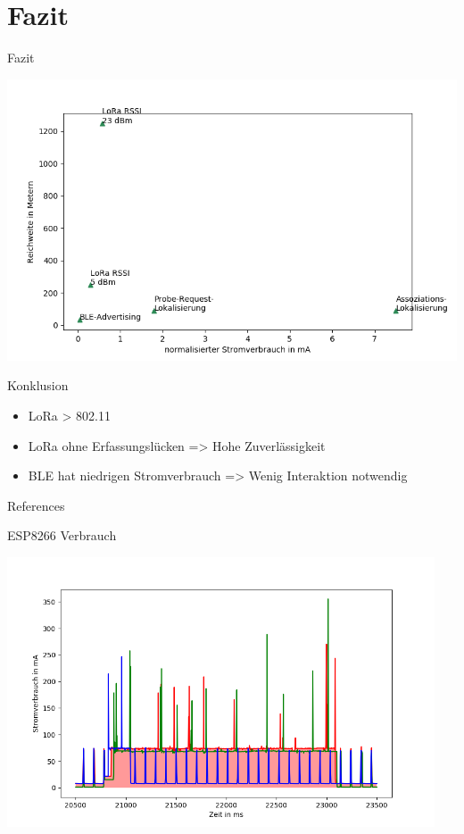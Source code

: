 \documentclass[18pt]{beamer}
\begin{document}
\section{Fazit}
\begin{frame}{Fazit}
	\begin{minipage}[t][0.5\textheight][t]{\textwidth}
		\centering
		\includegraphics[width=0.9\textheight]{plots/scatterplot.png}
	\end{minipage}


	\begin{block}{Konklusion}
			\begin{itemize}
				\item LoRa > 802.11
				\item LoRa ohne Erfassungslücken => Hohe Zuverlässigkeit
				\item BLE hat niedrigen Stromverbrauch => Wenig Interaktion notwendig
			\end{itemize}
	\end{block}

\end{frame}


\appendix
\beginbackup

\begin{frame}[allowframebreaks]{References}
\printbibliography
\end{frame}

\begin{frame}{ESP8266 Verbrauch}%
	\begin{minipage}[t][\textheight][t]{\textwidth}
		\centering
		\includegraphics[width=0.95\textwidth]{plots/wifillssendv2.png}
	\end{minipage}
\end{frame}
\end{document}
